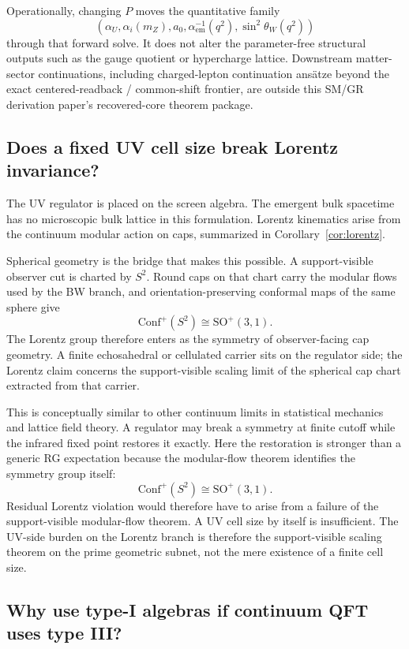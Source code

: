 \documentclass[11pt]{article}
\newcommand{\Conf}{\mathrm{Conf}}
\begin{document}
Operationally, changing \(P\) moves the quantitative family
\[
(\alpha_U,\alpha_i(m_Z),a_0,\alpha_{\mathrm{em}}^{-1}(q^2),\sin^2\theta_W(q^2))
\]
through that forward solve. It does not alter the parameter-free structural outputs such as the
gauge quotient or hypercharge lattice. Downstream matter-sector continuations, including
charged-lepton continuation ans\"atze beyond the exact centered-readback / common-shift frontier,
are outside this SM/GR derivation paper's recovered-core theorem package.

\subsection{Does a fixed UV cell size break Lorentz invariance?}

The UV regulator is placed on the screen algebra. The emergent bulk spacetime has no microscopic
bulk lattice in this formulation. Lorentz kinematics arise from the continuum modular action on
caps, summarized in Corollary~\ref{cor:lorentz}.

Spherical geometry is the bridge that makes this possible. A support-visible observer cut is
charted by \(S^2\). Round caps on that chart carry the modular flows used by the BW branch, and
orientation-preserving conformal maps of the same sphere give
\[
\Conf^+(S^2)\cong \mathrm{SO}^+(3,1).
\]
The Lorentz group therefore enters as the symmetry of observer-facing cap geometry. A finite
echosahedral or cellulated carrier sits on the regulator side; the Lorentz claim concerns the
support-visible scaling limit of the spherical cap chart extracted from that carrier.

This is conceptually similar to other continuum limits in statistical mechanics and lattice field theory. A regulator may break a symmetry at finite cutoff while the infrared fixed point restores it exactly. Here the restoration is stronger than a generic RG expectation because the modular-flow theorem identifies the symmetry group itself:
\[
\Conf^+(S^2)\cong \mathrm{SO}^+(3,1).
\]
Residual Lorentz violation would therefore have to arise from a failure of the support-visible modular-flow theorem. A UV cell size by itself is insufficient.
The UV-side burden on the Lorentz branch is therefore the support-visible scaling theorem on the prime geometric subnet, not the mere existence of a finite cell size.

\subsection{Why use type-I algebras if continuum QFT uses type III?}
\end{document}
